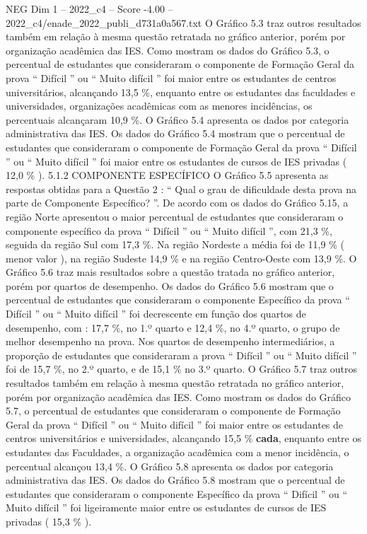 \begin{textsample}{NEG Dim 1 – 2022\_c4 – Score -4.00 – 2022\_c4/enade\_2022\_publi\_d731a0a567.txt}
O Gráfico 5.3 traz outros resultados também em relação à mesma questão retratada no gráfico anterior, porém por organização acadêmica das IES.
Como mostram os dados do Gráfico 5.3, o percentual de estudantes que consideraram o componente de Formação Geral da prova “ Difícil ” ou “ Muito difícil ” foi maior entre os estudantes de centros universitários, alcançando 13,5 \%, enquanto entre os estudantes das faculdades e universidades, organizações acadêmicas com as menores incidências, os percentuais alcançaram 10,9 \%.
O Gráfico 5.4 apresenta os dados por categoria administrativa das IES.
Os dados do Gráfico 5.4 mostram que o percentual de estudantes que consideraram o componente de Formação Geral da prova “ Difícil ” ou “ Muito difícil ” foi maior entre os estudantes de cursos de IES privadas ( 12,0 \% ). 5.1.2 COMPONENTE ESPECÍFICO O Gráfico 5.5 apresenta as respostas obtidas para a Questão 2 : “ Qual o grau de dificuldade desta prova na parte de Componente Específico? ”.
De acordo com os dados do Gráfico 5.15, a região Norte apresentou o maior percentual de estudantes que consideraram o componente específico da prova “ Difícil ” ou “ Muito difícil ”, com 21,3 \%, seguida da região Sul com 17,3 \%.
Na região Nordeste a média foi de 11,9 \% ( menor valor ), na região Sudeste 14,9 \% e na região Centro-Oeste com 13,9 \%.
O Gráfico 5.6 traz mais resultados sobre a questão tratada no gráfico anterior, porém por quartos de desempenho.
Os dados do Gráfico 5.6 mostram que o percentual de estudantes que consideraram o componente Específico da prova “ Difícil ” ou “ Muito difícil ” foi decrescente em função dos quartos de desempenho, com : 17,7 \%, no 1.º quarto e 12,4 \%, no 4.º quarto, o grupo de melhor desempenho na prova.
Nos quartos de desempenho intermediários, a proporção de estudantes que consideraram a prova “ Difícil ” ou “ Muito difícil ” foi de 15,7 \%, no 2.º quarto, e de 15,1 \% no 3.º quarto.
O Gráfico 5.7 traz outros resultados também em relação à mesma questão retratada no gráfico anterior, porém por organização acadêmica das IES.
Como mostram os dados do Gráfico 5.7, o percentual de estudantes que consideraram o componente de Formação Geral da prova “ Difícil ” ou “ Muito difícil ” foi maior entre os estudantes de centros universitários e universidades, alcançando 15,5 \% \textbf{cada}, enquanto entre os estudantes das Faculdades, a organização acadêmica com a menor incidência, o percentual alcançou 13,4 \%.
O Gráfico 5.8 apresenta os dados por categoria administrativa das IES.
Os dados do Gráfico 5.8 mostram que o percentual de estudantes que consideraram o componente Específico da prova “ Difícil ” ou “ Muito difícil ” foi ligeiramente maior entre os estudantes de cursos de IES privadas ( 15,3 \% ).

\end{textsample}
